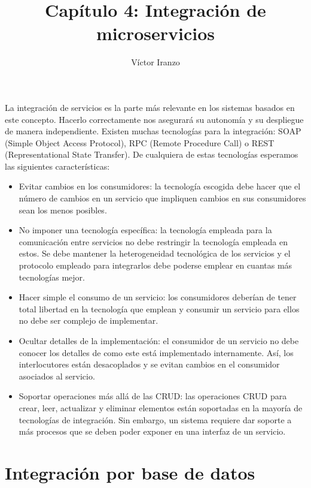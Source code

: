\documentclass[11pt,a4paper]{article}
\author{Víctor Iranzo}
\title{Capítulo 4: Integración de microservicios}
\begin{document}
\maketitle

La integración de servicios es la parte más relevante en los sistemas basados en este concepto. Hacerlo correctamente nos asegurará su autonomía y su despliegue de manera independiente. Existen muchas tecnologías para la integración: SOAP (Simple Object Access Protocol), RPC (Remote Procedure Call) o REST (Representational State Transfer). De cualquiera de estas tecnologías esperamos las siguientes características:

\begin{itemize}

\item Evitar cambios en los consumidores: la tecnología escogida debe hacer que el número de cambios en un servicio que impliquen cambios en sus consumidores sean los menos posibles.

\item No imponer una tecnología específica: la tecnología empleada para la comunicación entre servicios no debe restringir la tecnología empleada en estos. Se debe mantener la heterogeneidad tecnológica de los servicios y el protocolo empleado para integrarlos debe poderse emplear en cuantas más tecnologías mejor.

\item Hacer simple el consumo de un servicio: los consumidores deberían de tener total libertad en la tecnología que emplean y consumir un servicio para ellos no debe ser complejo de implementar.

\item Ocultar detalles de la implementación: el consumidor de un servicio no debe conocer los detalles de como este está implementado internamente. Así, los interlocutores están desacoplados y se evitan cambios en el consumidor asociados al servicio.

\item Soportar operaciones más allá de las CRUD: las operaciones CRUD para crear, leer, actualizar y eliminar elementos están soportadas en la mayoría de tecnologías de integración. Sin embargo, un sistema requiere dar soporte a más procesos que se deben poder exponer en una interfaz de un servicio.

\end{itemize}

\section{Integración por base de datos}
\end{document}
